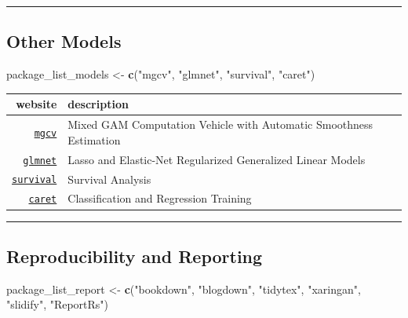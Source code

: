 \documentclass[]{book}
\newenvironment{Shaded}{\begin{snugshade}}{\end{snugshade}}
\newcommand{\KeywordTok}[1]{\textcolor[rgb]{0.13,0.29,0.53}{\textbf{#1}}}
\newcommand{\StringTok}[1]{\textcolor[rgb]{0.31,0.60,0.02}{#1}}
\newcommand{\NormalTok}[1]{#1}
\theoremstyle{definition}
\theoremstyle{definition}
\theoremstyle{definition}
\theoremstyle{remark}
\begin{document}
\begin{center}\rule{0.5\linewidth}{\linethickness}\end{center}

\subsection{Other Models}\label{other-models}

\begin{Shaded}
\begin{Highlighting}[]
\NormalTok{package_list_models <-}\StringTok{ }\KeywordTok{c}\NormalTok{(}\StringTok{"mgcv"}\NormalTok{,}
                         \StringTok{"glmnet"}\NormalTok{,}
                         \StringTok{"survival"}\NormalTok{,}
                         \StringTok{"caret"}\NormalTok{)}
\end{Highlighting}
\end{Shaded}

\begin{longtable}[]{@{}rl@{}}
\toprule
website & description\tabularnewline
\midrule
\endhead
\href{https://people.maths.bris.ac.uk/~sw15190/mgcv/tampere/mgcv.pdf}{\texttt{mgcv}}
& Mixed GAM Computation Vehicle with Automatic Smoothness
Estimation\tabularnewline
\href{https://web.stanford.edu/~hastie/glmnet/glmnet_alpha.html}{\texttt{glmnet}}
& Lasso and Elastic-Net Regularized Generalized Linear
Models\tabularnewline
\href{https://github.com/therneau/survival}{\texttt{survival}} &
Survival Analysis\tabularnewline
\href{https://topepo.github.io/caret/index.html}{\texttt{caret}} &
Classification and Regression Training\tabularnewline
\bottomrule
\end{longtable}

\begin{center}\rule{0.5\linewidth}{\linethickness}\end{center}

\subsection{Reproducibility and
Reporting}\label{reproducibility-and-reporting}

\begin{Shaded}
\begin{Highlighting}[]
\NormalTok{package_list_report <-}\StringTok{ }\KeywordTok{c}\NormalTok{(}\StringTok{"bookdown"}\NormalTok{,}
                         \StringTok{"blogdown"}\NormalTok{,}
                         \StringTok{"tidytex"}\NormalTok{,}
                         \StringTok{"xaringan"}\NormalTok{,}
                         \StringTok{"slidify"}\NormalTok{,}
                         \StringTok{"ReportRs"}\NormalTok{)}
\end{Highlighting}
\end{Shaded}
\end{document}
